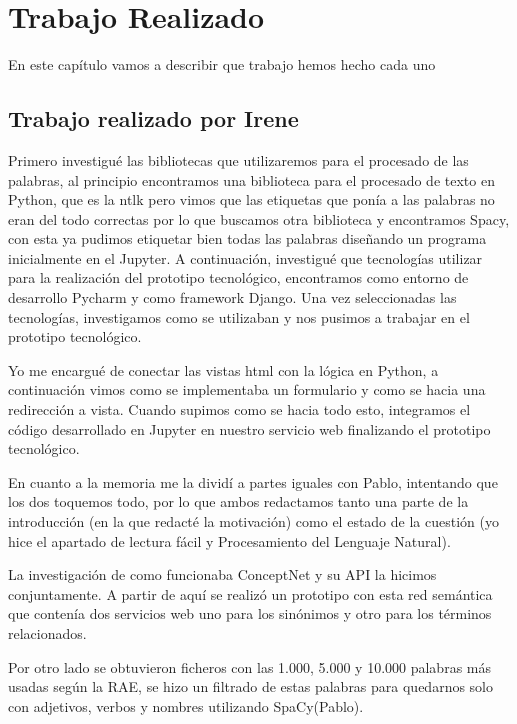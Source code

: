 \chapter{Trabajo Realizado}
\label{cap:TrabajoRealizado}


En este capítulo vamos a describir que trabajo hemos hecho cada uno


\section{Trabajo realizado por Irene}
\label{cap:sec:trabajo_Irene}

Primero investigué las bibliotecas que utilizaremos para el procesado de las palabras, al principio encontramos una biblioteca para el procesado de texto en Python, que es la ntlk pero vimos que las etiquetas que ponía a las palabras no eran del todo correctas por lo que buscamos otra biblioteca y encontramos Spacy, con esta ya pudimos etiquetar bien todas las palabras diseñando un programa inicialmente en el Jupyter. A continuación, investigué que tecnologías utilizar para la realización del prototipo tecnológico, encontramos como entorno de desarrollo Pycharm y como framework Django. Una vez seleccionadas las tecnologías, investigamos como se utilizaban y nos pusimos a trabajar en el prototipo tecnológico.

Yo me encargué de conectar las vistas html con la lógica en Python, a continuación vimos como se implementaba un formulario y como se hacia una redirección a vista. Cuando supimos como se hacia todo esto, integramos el código desarrollado en Jupyter en nuestro servicio web finalizando el prototipo tecnológico.

En cuanto a la memoria me la dividí a partes iguales con Pablo, intentando que los dos toquemos todo, por lo que ambos redactamos tanto una parte de la introducción (en la que redacté la motivación) como el estado de la cuestión (yo hice el apartado de lectura fácil y Procesamiento del Lenguaje Natural).

La investigación de como funcionaba ConceptNet y su API la hicimos conjuntamente. A partir de aquí se realizó un prototipo con esta red semántica que contenía dos servicios web uno para los sinónimos y otro para los términos relacionados. 

Por otro lado se obtuvieron ficheros con las 1.000, 5.000 y 10.000 palabras más usadas según la RAE, se hizo un filtrado de estas palabras para quedarnos solo con adjetivos, verbos y nombres utilizando SpaCy(Pablo).

